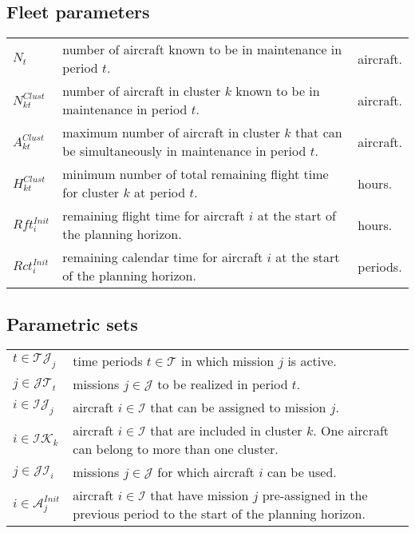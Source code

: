 \documentclass[a4paper,onecolumn,fleqn]{article}
\begin{document}
    \subsection{Fleet parameters}

        \begin{tabular}{p{15mm}p{125mm}p{15mm}}
            $N_t$               & number of aircraft known to be in maintenance in period $t$. & aircraft. \\
            $N^{Clust}_{kt}$    & number of aircraft in cluster $k$ known to be in maintenance in period $t$. & aircraft. \\
            $A^{Clust}_{kt}$    & maximum number of aircraft in cluster $k$ that can be simultaneously in maintenance in period $t$. & aircraft. \\
            $H^{Clust}_{kt}$    & minimum number of total remaining flight time for cluster $k$ at period $t$. & hours. \\
            $Rft^{Init}_i$      & remaining flight time for aircraft $i$ at the start of the planning horizon.  & hours.  \\
            $Rct^{Init}_i$      & remaining calendar time for aircraft $i$ at the start of the planning horizon.  & periods. \\
        \end{tabular}

    \subsection{Parametric sets}

        \begin{tabular}{p{15mm}p{140mm}}
            $t \in \mathcal{TJ}_j$     &  time periods $t \in \mathcal{T}$ in which mission $j$ is active. \\
            $j \in \mathcal{JT}_t$    &  missions $j \in \mathcal{J}$ to be realized in period $t$. \\
            $i \in \mathcal{IJ}_j$     &  aircraft $i \in \mathcal{I}$ that can be assigned to mission $j$. \\
            $i \in \mathcal{IK}_k$     &  aircraft $i \in \mathcal{I}$ that are included in cluster $k$. One aircraft can belong to more than one cluster. \\
            $j \in \mathcal{JI}_i$     &  missions $j \in \mathcal{J}$ for which aircraft $i$ can be used. \\
            $i \in \mathcal{A}^{Init}_j$  & aircraft $i \in \mathcal{I}$ that have mission $j$ pre-assigned in the previous period to the start of the planning horizon. \\
        \end{tabular}
\end{document}
